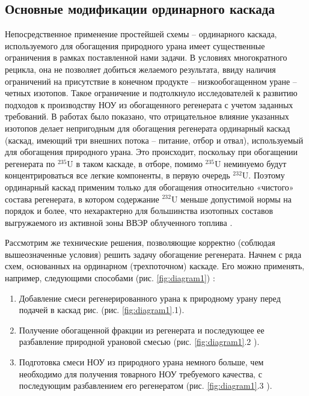 \subsection{Основные модификации ординарного каскада}

Непосредственное применение простейшей схемы -- ординарного каскада, используемого для обогащения природного урана имеет существенные ограничения в рамках поставленной нами задачи.
В условиях многократного рецикла, она не позволяет добиться желаемого результата, ввиду наличия ограничений на присутствие в конечном продукте -- низкообогащенном уране -- четных изотопов.
Такое ограничение и подтолкнуло исследователей к развитию подходов к производству НОУ из обогащенного регенерата с учетом заданных требований.
В работах \cite{sulaberidzeNekotoryhRazdelitelnyhProblemah2004,sulaberidzeProblemsRefinementRecycled4, smirnovKaskadnyeShemyZadachah2012} было показано, что отрицательное влияние указанных изотопов делает непригодным для обогащения регенерата ординарный каскад (каскад, имеющий три внешних потока – питание, отбор и отвал), используемый для обогащения природного урана. Это происходит, поскольку при обогащении регенерата по $^{235}$U в таком каскаде, в отборе, помимо $^{235}$U неминуемо будут концентрироваться все легкие компоненты, в первую очередь $^{232}$U. Поэтому ординарный каскад применим только для обогащения относительно «чистого» состава регенерата, в котором содержание $^{232}$U меньше допустимой нормы на порядок и более, что нехарактерно для большинства изотопных составов выгружаемого из активной зоны ВВЭР облученного топлива \cite{bormanTehnikoekonomicheskiyAnalizVozmozhnyh2012}.

Рассмотрим же технические решения, позволяющие корректно (соблюдая вышеозначенные условия) решить задачу обогащение регенерата. Начнем с ряда схем, основанных на ординарном (трехпоточном) каскаде.
Его можно применять, например, следующими способами (рис. \ref{fig:diagram1}) \cite{smirnovKaskadnyeShemyZadachah2012}:
\begin{enumerate}
  \item Добавление смеси регенерированного урана к природному урану перед подачей в каскад рис. (рис. \ref{fig:diagram1}.1).
  \item Получение обогащенной фракции из регенерата и последующее ее разбавление природной урановой смесью (рис. \ref{fig:diagram1}.2 ).
  \item Подготовка смеси НОУ из природного урана немного больше, чем необходимо для получения товарного НОУ требуемого качества, с последующим разбавлением его регенератом (рис. \ref{fig:diagram1}.3 ).
\end{enumerate}

